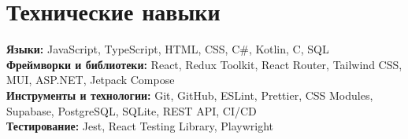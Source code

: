 \documentclass[letterpaper,10pt]{article}
\begin{document}
\section{Технические навыки}
\begin{itemize}[leftmargin=0.15in, label={}, nosep]
  \small{
    \item{
      \textbf{Языки:}
      JavaScript, TypeScript, HTML, CSS, C\#, Kotlin, C, SQL \\

      \textbf{Фреймворки и библиотеки:}
      React, Redux Toolkit, React Router, Tailwind CSS, MUI, ASP.NET, Jetpack Compose \\

      \textbf{Инструменты и технологии:}
      Git, GitHub, ESLint, Prettier, CSS Modules, Supabase, PostgreSQL, SQLite, REST API, CI/CD \\

      \textbf{Тестирование:}
      Jest, React Testing Library, Playwright
    }
  }
\end{itemize}
\end{document}
